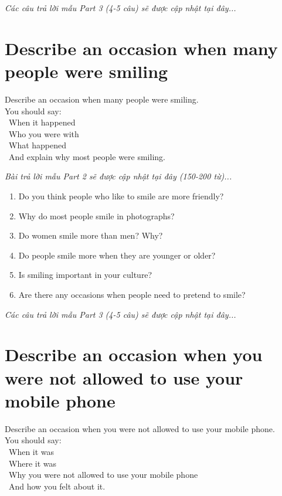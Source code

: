 \vspace{1em}
\textit{Các câu trả lời mẫu Part 3 (4-5 câu) sẽ được cập nhật tại đây...}
\vspace{2em}

\section{Describe an occasion when many people were smiling}
\begin{ieltsprompt}
Describe an occasion when many people were smiling. \\
You should say: \\
\textbullet\ When it happened \\
\textbullet\ Who you were with \\
\textbullet\ What happened \\
\textbullet\ And explain why most people were smiling. \\
\end{ieltsprompt}

\vspace{1em}
\textit{Bài trả lời mẫu Part 2 sẽ được cập nhật tại đây (150-200 từ)...}
\vspace{2em}

\begin{ieltsprompt}
\begin{enumerate}[itemsep=4pt]
    \item Do you think people who like to smile are more friendly?
    \item Why do most people smile in photographs?
    \item Do women smile more than men? Why?
    \item Do people smile more when they are younger or older?
    \item Is smiling important in your culture?
    \item Are there any occasions when people need to pretend to smile?
\end{enumerate}
\end{ieltsprompt}

\vspace{1em}
\textit{Các câu trả lời mẫu Part 3 (4-5 câu) sẽ được cập nhật tại đây...}
\vspace{2em}

\section{Describe an occasion when you were not allowed to use your mobile phone}
\begin{ieltsprompt}
Describe an occasion when you were not allowed to use your mobile phone. \\
You should say: \\
\textbullet\ When it was \\
\textbullet\ Where it was \\
\textbullet\ Why you were not allowed to use your mobile phone \\
\textbullet\ And how you felt about it. \\
\end{ieltsprompt}

